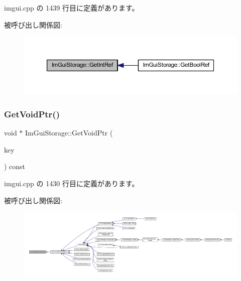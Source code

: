  imgui.\+cpp の 1439 行目に定義があります。

被呼び出し関係図\+:\nopagebreak
\begin{figure}[H]
\begin{center}
\leavevmode
\includegraphics[width=350pt]{struct_im_gui_storage_a28673fa7839263f3066ccb8e93e748a9_icgraph}
\end{center}
\end{figure}
\mbox{\label{struct_im_gui_storage_aaf87a98ede89da09113b0189f6d878ca}} 
\subsubsection{\texorpdfstring{Get\+Void\+Ptr()}{GetVoidPtr()}}
{\footnotesize\ttfamily void $\ast$ Im\+Gui\+Storage\+::\+Get\+Void\+Ptr (\begin{DoxyParamCaption}\item[{\mbox{\hyperlink{imgui_8h_a1785c9b6f4e16406764a85f32582236f}{Im\+Gui\+ID}}}]{key }\end{DoxyParamCaption}) const}



 imgui.\+cpp の 1430 行目に定義があります。

被呼び出し関係図\+:
\nopagebreak
\begin{figure}[H]
\begin{center}
\leavevmode
\includegraphics[width=350pt]{struct_im_gui_storage_aaf87a98ede89da09113b0189f6d878ca_icgraph}
\end{center}
\end{figure}
\mbox{\label{struct_im_gui_storage_a2b203317f3f488818e9b9f416fe35332}} 
